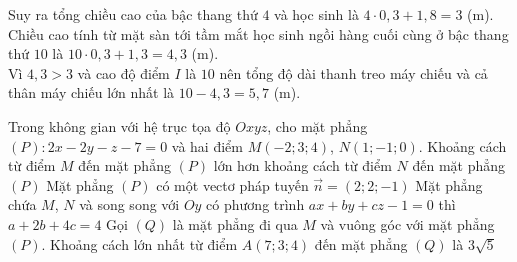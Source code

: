 \begin{ex}
{\begin{itemchoice}
			Suy ra tổng chiều cao của bậc thang thứ $4$ và học sinh là $4 \cdot 0,3+1,8=3$ (m).\\
			Chiều cao tính từ mặt sàn tới tầm mắt học sinh ngồi hàng cuối cùng ở bậc thang thứ $10$ là $10 \cdot 0{,}3+1{,}3=4{,}3$ (m).\\
			Vì $4{,}3>3$ và cao độ điểm $I$ là $10$ nên tổng độ dài thanh treo máy chiếu và cả thân máy chiếu lớn nhất là $10-4{,}3=5{,}7$ (m).
		\end{itemchoice}
	}
\end{ex}

\begin{ex}%
	Trong không gian với hệ trục tọa độ $Oxyz$, cho mặt phẳng $(P)\colon 2x - 2y - z - 7 = 0$ và hai điểm $M(-2; 3; 4)$, $N(1; -1; 0)$.
	\choiceTF
	{\True Khoảng cách từ điểm $M$ đến mặt phẳng $(P)$ lớn hơn khoảng cách từ điểm $N$ đến mặt phẳng $(P)$}
	{Mặt phẳng $(P)$ có một vectơ pháp tuyến $\overrightarrow{n} = (2; 2; -1)$}
	{\True Mặt phẳng chứa $M$, $N$ và song song với $Oy$ có phương trình $ax + by + cz - 1 = 0$ thì $a + 2b + 4c = 4$}
	{\True Gọi $(Q)$ là mặt phẳng đi qua $M$ và vuông góc với mặt phẳng $(P)$. Khoảng cách lớn nhất từ điểm $A(7; 3; 4)$ đến mặt phẳng $(Q)$ là $3\sqrt{5}$}
\end{ex}
